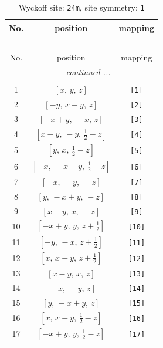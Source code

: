 \documentclass[fleqn,8pt]{jsarticle}
\begin{document}
\begin{longtable}{ccc}
\caption{Wyckoff site: {\tt 24m}, site symmetry: {\tt 1}}
 \\
 \hline \hline
No. & position & mapping \\ \hline \endfirsthead

\multicolumn{2}{l}{\tablename\ \thetable{}} \\
 \hline \hline
No. & position & mapping \\ \hline \endhead

 \hline \hline
\multicolumn{2}{r}{\footnotesize\it continued ...} \\ \endfoot

 \hline \hline
\multicolumn{2}{r}{} \\ \endlastfoot

1 & $\left[ x,\, y,\, z \right]$ & {\tt [1]} \\ \hline
2 & $\left[ - y,\, x - y,\, z \right]$ & {\tt [2]} \\ \hline
3 & $\left[ - x + y,\, - x,\, z \right]$ & {\tt [3]} \\ \hline
4 & $\left[ x - y,\, - y,\, \frac{1}{2} - z \right]$ & {\tt [4]} \\ \hline
5 & $\left[ y,\, x,\, \frac{1}{2} - z \right]$ & {\tt [5]} \\ \hline
6 & $\left[ - x,\, - x + y,\, \frac{1}{2} - z \right]$ & {\tt [6]} \\ \hline
7 & $\left[ - x,\, - y,\, - z \right]$ & {\tt [7]} \\ \hline
8 & $\left[ y,\, - x + y,\, - z \right]$ & {\tt [8]} \\ \hline
9 & $\left[ x - y,\, x,\, - z \right]$ & {\tt [9]} \\ \hline
10 & $\left[ - x + y,\, y,\, z + \frac{1}{2} \right]$ & {\tt [10]} \\ \hline
11 & $\left[ - y,\, - x,\, z + \frac{1}{2} \right]$ & {\tt [11]} \\ \hline
12 & $\left[ x,\, x - y,\, z + \frac{1}{2} \right]$ & {\tt [12]} \\ \hline
13 & $\left[ x - y,\, x,\, z \right]$ & {\tt [13]} \\ \hline
14 & $\left[ - x,\, - y,\, z \right]$ & {\tt [14]} \\ \hline
15 & $\left[ y,\, - x + y,\, z \right]$ & {\tt [15]} \\ \hline
16 & $\left[ x,\, x - y,\, \frac{1}{2} - z \right]$ & {\tt [16]} \\ \hline
17 & $\left[ - x + y,\, y,\, \frac{1}{2} - z \right]$ & {\tt [17]} \\ \hline

\end{longtable}
\end{document}
